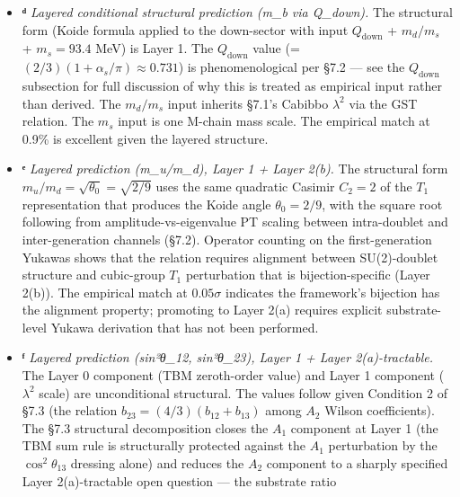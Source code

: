 \documentclass[
]{article}
\begin{document}
\begin{itemize}
  effects is \(\sim 1\)--\(2\%\) (§7.5). Within the four-layer framing
  (§8.3), \(K = 1/2\) is now Layer 1 closed at the structural-identity
  level, with the Layer 2(a)-tractable residual being whether the OI's
  specific taste-decomposed Coleman-Weinberg one-loop calculation
  reproduces \(K = 1/(n_{\text{gen}} - 1)\) explicitly.
\item
  \textbf{ᵈ} \emph{Layered conditional structural prediction (m\_b via
  Q\_down).} The structural form (Koide formula applied to the
  down-sector with input \(Q_{\text{down}}\) + \(m_d/m_s\) +
  \(m_s = 93.4\) MeV) is Layer 1. The \(Q_{\text{down}}\) value (=
  \((2/3)(1 + \alpha_s/\pi) \approx 0.731\)) is phenomenological per
  §7.2 --- see the \(Q_\text{down}\) subsection for full discussion of
  why this is treated as empirical input rather than derived. The
  \(m_d/m_s\) input inherits §7.1's Cabibbo \(\lambda^2\) via the GST
  relation. The \(m_s\) input is one M-chain mass scale. The empirical
  match at 0.9\% is excellent given the layered structure.
\item
  \textbf{ᵉ} \emph{Layered prediction (m\_u/m\_d), Layer 1 + Layer
  2(b).} The structural form \(m_u/m_d = \sqrt{\theta_0} = \sqrt{2/9}\)
  uses the same quadratic Casimir \(C_2 = 2\) of the \(T_1\)
  representation that produces the Koide angle \(\theta_0 = 2/9\), with
  the square root following from amplitude-vs-eigenvalue PT scaling
  between intra-doublet and inter-generation channels (§7.2). Operator
  counting on the first-generation Yukawas shows that the relation
  requires alignment between SU(2)-doublet structure and cubic-group
  \(T_1\) perturbation that is bijection-specific (Layer 2(b)). The
  empirical match at \(0.05\sigma\) indicates the framework's bijection
  has the alignment property; promoting to Layer 2(a) requires explicit
  substrate-level Yukawa derivation that has not been performed.
\item
  \textbf{ᶠ} \emph{Layered prediction (sin²θ\_12, sin²θ\_23), Layer 1 +
  Layer 2(a)-tractable.} The Layer 0 component (TBM zeroth-order value)
  and Layer 1 component (\(\lambda^2\) scale) are unconditional
  structural. The values follow given Condition 2 of §7.3 (the relation
  \(b_{23} = (4/3)(b_{12}+b_{13})\) among \(A_2\) Wilson coefficients).
  The §7.3 structural decomposition closes the \(A_1\) component at
  Layer 1 (the TBM sum rule is structurally protected against the
  \(A_1\) perturbation by the \(\cos^2\theta_{13}\) dressing alone) and
  reduces the \(A_2\) component to a sharply specified Layer
  2(a)-tractable open question --- the substrate ratio

\end{itemize}
\end{document}
